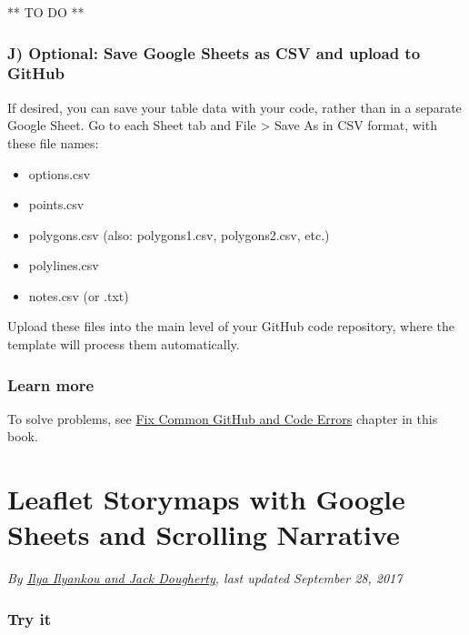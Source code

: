\documentclass[
  english,
]{book}
\providecommand{\tightlist}{%
  \setlength{\itemsep}{0pt}\setlength{\parskip}{0pt}}
\begin{document}
** TO DO **

\hypertarget{j-optional-save-google-sheets-as-csv-and-upload-to-github}{%
\subsubsection*{J) Optional: Save Google Sheets as CSV and upload to GitHub}\label{j-optional-save-google-sheets-as-csv-and-upload-to-github}}

If desired, you can save your table data with your code, rather than in a separate Google Sheet. Go to each Sheet tab and File \textgreater{} Save As in CSV format, with these file names:

\begin{itemize}
\tightlist
\item
  options.csv
\item
  points.csv
\item
  polygons.csv (also: polygons1.csv, polygons2.csv, etc.)
\item
  polylines.csv
\item
  notes.csv (or .txt)
\end{itemize}

Upload these files into the main level of your GitHub code repository, where the template will process them automatically.

\hypertarget{learn-more-21}{%
\subsubsection*{Learn more}\label{learn-more-21}}

To solve problems, see \href{fix-code}{Fix Common GitHub and Code Errors} chapter in this book.

\hypertarget{leaflet-storymaps-with-google-sheets}{%
\section{Leaflet Storymaps with Google Sheets and Scrolling Narrative}\label{leaflet-storymaps-with-google-sheets}}

\emph{By \href{authors}{Ilya Ilyankou and Jack Dougherty}, last updated September 28, 2017}

\hypertarget{try-it-9}{%
\subsubsection*{Try it}\label{try-it-9}}
\end{document}
